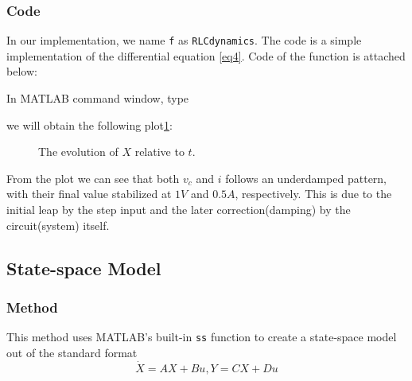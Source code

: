 \documentclass{article}
\begin{document}
  \subsubsection{Code}
  In our implementation, we name \verb+f+ as \verb+RLCdynamics+. The code is a simple implementation of the differential equation \eqref{eq4}. Code of the function is attached below:
  
  In MATLAB command window, type
  
  we will obtain the following plot\ref{fig:x-t}:
  \begin{figure}[H]
    \centering
    \noindent{}
    \caption{The evolution of $X$ relative to $t$.} \label{fig:x-t}
  \end{figure}
  \par
  From the plot we can see that both $v_c$ and $i$ follows an underdamped pattern, with their final value stabilized at $1 V$ and $0.5 A$, respectively. This is due to the initial leap by the step input and the later correction(damping) by the circuit(system) itself.

  \subsection{State-space Model}
  \subsubsection{Method}
  This method uses MATLAB's built-in \verb+ss+ function to create a state-space model out of the standard format 
  $$\dot{X} = AX + Bu, Y = CX + Du$$
\end{document}
